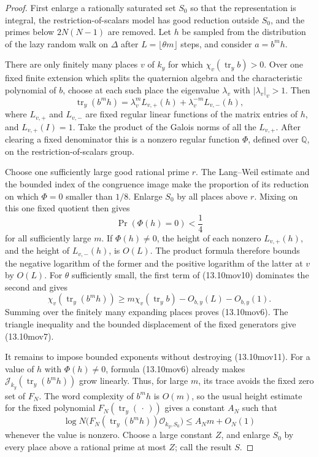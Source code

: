 \documentclass[11pt,reqno]{amsart}
\theoremstyle{definition}
\theoremstyle{remark}
\newcommand{\Q}{\mathbb Q}
\newcommand{\cO}{\mathcal O}
\newcommand{\Tr}{\operatorname{tr}}
\begin{document}
\begin{proof}
First enlarge a rationally saturated set \(S_0\) so that the representation
is integral, the restriction-of-scalars model has good reduction outside
\(S_0\), and the primes below \(2N(N-1)\) are removed.  Let \(h\) be
sampled from the distribution of the lazy random walk on \(\Delta\) after
\(L=\lfloor\theta m\rfloor\) steps, and consider \(a=b^mh\).

There are only finitely many places \(v\) of \(k_y\) for which
\(\chi_v(\Tr_yb)>0\).  Over one fixed finite extension which splits the
quaternion algebra and the characteristic polynomial of \(b\), choose at
each such place the eigenvalue \(\lambda_v\) with \(|\lambda_v|_v>1\).
Then
\[
 \Tr_y(b^mh)=\lambda_v^mL_{v,+}(h)
              +\lambda_v^{-m}L_{v,-}(h),
\tag{13.10mov10}
\]
where \(L_{v,+}\) and \(L_{v,-}\) are fixed regular linear functions of
the matrix entries of \(h\), and \(L_{v,+}(I)=1\).  Take the product of
the Galois norms of all the \(L_{v,+}\).  After clearing a fixed
denominator this is a nonzero regular function \(\Phi\), defined over
\(\Q\), on the restriction-of-scalars group.

Choose one sufficiently large good rational prime \(r\).  The Lang--Weil
estimate \cite{LangWeil} and the bounded index of the congruence image make the proportion of its
reduction on which \(\Phi=0\) smaller than \(1/8\).  Enlarge \(S_0\) by
all places above \(r\).  Mixing on this one fixed quotient then gives
\[
 \Pr(\Phi(h)=0)<\frac14
\tag{13.10mov11}
\]
for all sufficiently large \(m\).  If \(\Phi(h)\ne0\), the height of each
nonzero \(L_{v,+}(h)\), and the height of \(L_{v,-}(h)\), is \(O(L)\).
The product formula therefore bounds the negative logarithm of the former
and the positive logarithm of the latter at \(v\) by \(O(L)\).  For
\(\theta\) sufficiently small, the first term of (13.10mov10) dominates
the second and gives
\[
 \chi_v(\Tr_y(b^mh))
 \ge m\chi_v(\Tr_yb)-O_{b,y}(L)-O_{b,y}(1).
\]
Summing over the finitely many expanding places proves (13.10mov6).
The triangle inequality and the bounded displacement of the fixed
generators give (13.10mov7).

It remains to impose bounded exponents without destroying (13.10mov11).
For a value of \(h\) with \(\Phi(h)\ne0\), formula (13.10mov6) already makes
\(\mathcal J_{k_y}(\Tr_y(b^mh))\) grow linearly.  Thus, for large \(m\),
its trace avoids the fixed zero set of \(F_N\).
The word complexity of \(b^mh\) is \(O(m)\), so the usual height estimate
for the fixed polynomial \(F_N(\Tr_y(\,\cdot\,))\) gives a constant \(A_N\)
such that
\[
 \log N\bigl(F_N(\Tr_y(b^mh))\cO_{k_y,S_0}\bigr)
 \le A_Nm+O_N(1)
\tag{13.10mov12}
\]
whenever the value is nonzero.  Choose a large constant \(Z\), and enlarge
\(S_0\) by every place above a rational prime at most \(Z\); call the
result \(S\).


\end{proof}
\end{document}
